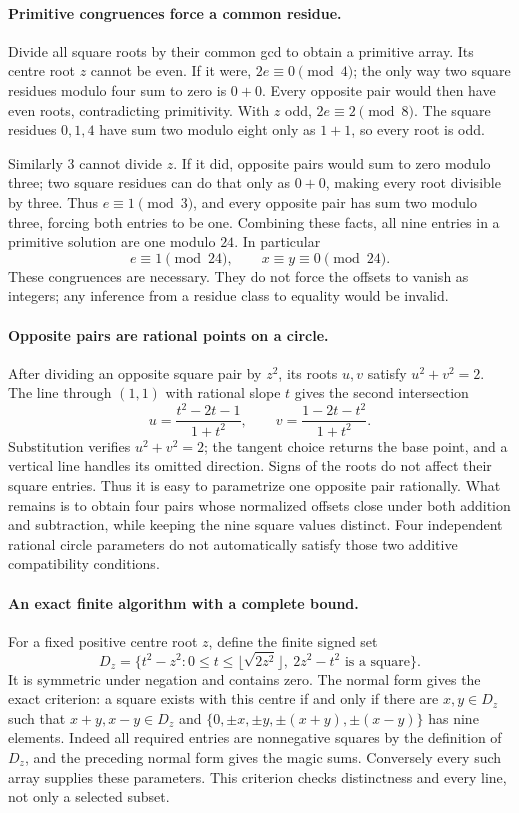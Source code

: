 \documentclass[11pt,a4paper]{article}
\begin{document}
\paragraph{Primitive congruences force a common residue.}
Divide all square roots by their common gcd to obtain a primitive array.
Its centre root $z$ cannot be even. If it were, $2e\equiv0\pmod4$;
the only way two square residues modulo four sum to zero is $0+0$.
Every opposite pair would then have even roots, contradicting
primitivity. With $z$ odd, $2e\equiv2\pmod8$. The square residues
$0,1,4$ have sum two modulo eight only as $1+1$, so every root is odd.

Similarly $3$ cannot divide $z$. If it did, opposite pairs would sum
to zero modulo three; two square residues can do that only as $0+0$,
making every root divisible by three. Thus $e\equiv1\pmod3$, and
every opposite pair has sum two modulo three, forcing both entries to
be one. Combining these facts, all nine entries in a primitive solution
are one modulo $24$. In particular
\[
 e\equiv1\pmod{24},\qquad x\equiv y\equiv0\pmod{24}.
\]
These congruences are necessary. They do not force the offsets to vanish
as integers; any inference from a residue class to equality would be
invalid.

\paragraph{Opposite pairs are rational points on a circle.}
After dividing an opposite square pair by $z^2$, its roots $u,v$ satisfy
$u^2+v^2=2$. The line through $(1,1)$ with rational slope $t$ gives
the second intersection
\[
 u=\frac{t^2-2t-1}{1+t^2},\qquad
 v=\frac{1-2t-t^2}{1+t^2}.
\]
Substitution verifies $u^2+v^2=2$; the tangent choice returns the base
point, and a vertical line handles its omitted direction. Signs of
the roots do not affect their square entries. Thus it is easy to
parametrize one opposite pair rationally. What remains is to obtain
four pairs whose normalized offsets close under both addition and
subtraction, while keeping the nine square values distinct. Four
independent rational circle parameters do not automatically satisfy
those two additive compatibility conditions.

\paragraph{An exact finite algorithm with a complete bound.}
For a fixed positive centre root $z$, define the finite signed set
\[
 D_z=\{t^2-z^2:0\le t\le\lfloor\sqrt{2z^2}\rfloor,
                       \ 2z^2-t^2\text{ is a square}\}.
\]
It is symmetric under negation and contains zero. The normal form gives
the exact criterion: a square exists with this centre if and only if
there are $x,y\in D_z$ such that $x+y,x-y\in D_z$ and
$\{0,\pm x,\pm y,\pm(x+y),\pm(x-y)\}$ has nine elements.
Indeed all required entries are nonnegative squares by the definition
of $D_z$, and the preceding normal form gives the magic sums.
Conversely every such array supplies these parameters. This criterion
checks distinctness and every line, not only a selected subset.
\end{document}
